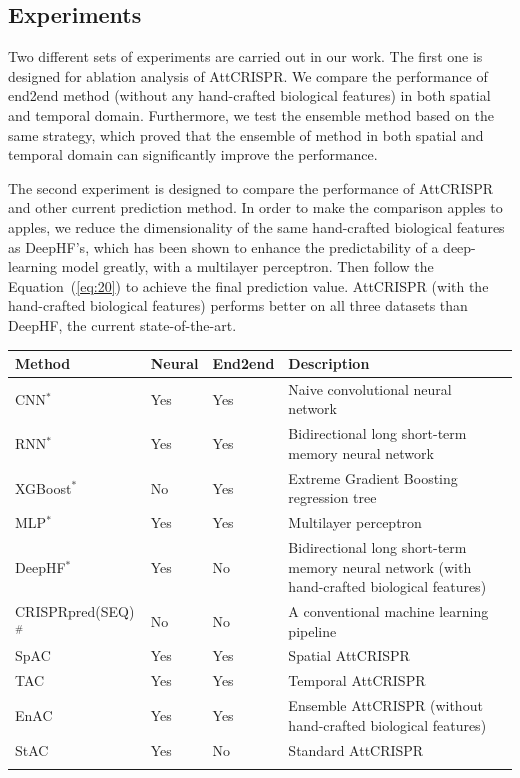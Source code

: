 \documentclass{bioinfo}
\begin{document}
\subsection{Experiments}

Two different sets of experiments are carried out in our work. 
The first one is designed for ablation analysis of AttCRISPR. 
We compare the performance of end2end method (without any hand-crafted biological features) in both spatial and temporal domain. 
Furthermore, we test the ensemble method based on the same strategy, which proved that the ensemble of method in both spatial and temporal domain can significantly improve the performance. 

The second experiment is designed to compare the performance of AttCRISPR and other current prediction method. 
In order to make the comparison apples to apples, we reduce the dimensionality of the same hand-crafted biological features as DeepHF's, 
which has been shown to enhance the predictability of a deep-learning model greatly, with a multilayer perceptron. 
Then follow the Equation~(\ref{eq:20}) to achieve the final prediction value. 
AttCRISPR (with the hand-crafted biological features) performs better on all three datasets than DeepHF, the current state-of-the-art. 

\begin{table}[!tpb]
    {\begin{tabular}{@{}lllp{3.5cm}l@{}}\toprule
        Method & Neural & End2end & Description\\\midrule
        CNN$^*$ & Yes & Yes & Naive convolutional neural network\\
        RNN$^*$ & Yes & Yes & Bidirectional long short-term memory neural network\\
        XGBoost$^*$ & No & Yes & Extreme Gradient Boosting regression tree\\
        MLP$^*$ & Yes & Yes & Multilayer perceptron\\
        DeepHF$^*$ & Yes & No & Bidirectional long short-term memory neural network (with hand-crafted biological features)\\
        CRISPRpred(SEQ)$^{\#}$ & No & No & A conventional machine learning pipeline\\
        SpAC & Yes & Yes & Spatial AttCRISPR\\
        TAC & Yes & Yes & Temporal AttCRISPR\\
        EnAC & Yes & Yes & Ensemble AttCRISPR (without hand-crafted biological features)\\
        StAC & Yes & No & Standard AttCRISPR\\
        \botrule
    \end{tabular}}\footnotesize{}
\end{table}
\end{document}
